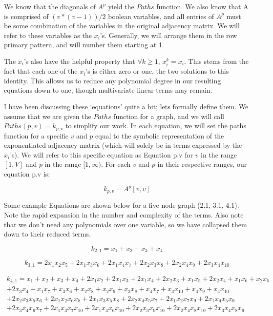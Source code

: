 \documentclass[11pt,a4paper]{report}
\begin{document}
We know that the diagonals of \(A^p\) yield the \(Paths\) function.
We also know that A is comprised of \((v * (v - 1)) / 2\) boolean variables, and all entries of \(A^p\) must be some combination of the variables in the original adjacency matrix. 
We will refer to these variables as the \(x_i\)'s. Generally, we will arrange them in the row primary pattern, and will number them starting at 1.

The \(x_i\)'s also have the helpful property that \(\forall k \geq 1,\, x_i^k = x_i \). 
This stems from the fact that each one of the \(x_i\)'s is either zero or one, the two solutions to this identity.  
This allows us to reduce any polynomial degree in our resulting equations down to one, though multivariate linear terms may remain.

I have been discussing these `equations' quite a bit; lets formally define them.  
We assume that we are given the \(Paths\) function for a graph, and we will call \(Paths(p, v) = k_{p, v}\) to simplify our work. 
In each equation, we will set the paths function for a specific \(v\) and \(p\) equal to the symbolic representation of the exponentiated adjacency matrix (which will solely be in terms expressed by the \(x_i\)'s).
We will refer to this specific equation as Equation p.v for \(v\) in the range \([1, V]\) and \(p\) in the range \([1, \infty)\).
For each \(v\) and \(p\) in their respective ranges, our equation p.v is:

\[k_{p, v} = A^p[v,v]\]

Some example Equations are shown below for a five node graph (2.1, 3.1, 4.1). 
Note the rapid expansion in the number and complexity of the terms.  
Also note that we don't need any polynomials over one variable, so we have collapsed them down to their reduced terms.

\[k_{2,1} = x_1 + x_2 + x_3 + x_4\]

\[k_{3,1} = 2x_1x_2x_5 + 2x_1x_3x_6 + 2x_1x_4x_7 + 2x_2x_3x_8 + 2x_2x_4x_9 + 2x_3x_4x_{10}\]

\begin{equation}\begin{aligned} k_{4,1} = x_1 + x_2 + x_3 + x_4 + 2x_1x_2 + 2x_1x_3 + 2x_1x_4 + 2x_2x_3 + x_1x_5 + 2x_2x_4 + x_1x_6 + x_2x_5 \\ + 2x_3x_4 + x_1x_7 + x_3x_6 + x_2x_8 + x_2x_9 + x_3x_8 + x_4x_7 + x_3x_{10} + x_4x_9 + x_4x_{10} \\ + 2x_2x_3x_5x_6 + 2x_1x_2x_6x_8 + 2x_1x_3x_5x_8 + 2x_2x_4x_5x_7 + 2x_1x_2x_7x_9 + 2x_1x_4x_5x_9 \\+ 2x_3x_4x_6x_7 + 2x_1x_3x_7x_{10} + 2x_1x_4x_6x_{10} + 2x_2x_3x_9x_{10} + 2x_2x_4x_8x_{10} + 2x_3x_4x_8x_9 \end{aligned}\end{equation}
\end{document}

